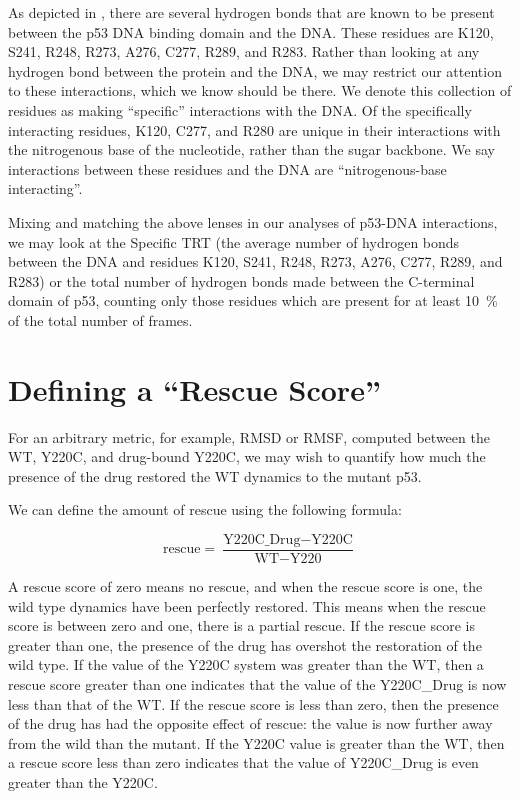 As depicted in , there are several hydrogen bonds that are known to be present between the p53 DNA binding domain and the DNA. These residues are K120, S241, R248, R273, A276, C277, R289, and R283. Rather than looking at any hydrogen bond between the protein and the DNA, we may restrict our attention to these interactions, which we know should be there. We denote this collection of residues as making ``specific'' interactions with the DNA. Of the specifically interacting residues, K120, C277, and R280 are unique in their interactions with the nitrogenous base of the nucleotide, rather than the sugar backbone. We say interactions between these residues and the DNA are ``nitrogenous-base interacting''.

Mixing and matching the above lenses in our analyses of p53-DNA interactions, we may look at the Specific TRT (the average number of hydrogen bonds between the DNA and residues K120, S241, R248, R273, A276, C277, R289, and R283) or the total number of hydrogen bonds made between the C-terminal domain of p53, counting only those residues which are present for at least \qty{10}{\percent} of the total number of frames.

\section{Defining a ``Rescue Score''}

For an arbitrary metric, for example, RMSD or RMSF, computed between the WT, Y220C, and drug-bound Y220C, we may wish to quantify how much the presence of the drug restored the WT dynamics to the mutant p53.

We can define the amount of rescue using the following formula:

\begin{equation*}
\text{rescue} = \frac{\text{Y220C\_Drug} - \text{Y220C}}{\text{WT} - \text{Y220}}
\end{equation*}

A rescue score of zero means no rescue, and when the rescue score is one, the wild type dynamics have been perfectly restored. This means when the rescue score is between zero and one, there is a partial rescue. If the rescue score is greater than one, the presence of the drug has overshot the restoration of the wild type. If the value of the Y220C system was greater than the WT, then a rescue score greater than one indicates that the value of the Y220C\_Drug is now less than that of the WT. If the rescue score is less than zero, then the presence of the drug has had the opposite effect of rescue: the value is now further away from the wild than the mutant. If the Y220C value is greater than the WT, then a rescue score less than zero indicates that the value of Y220C\_Drug is even greater than the Y220C.
